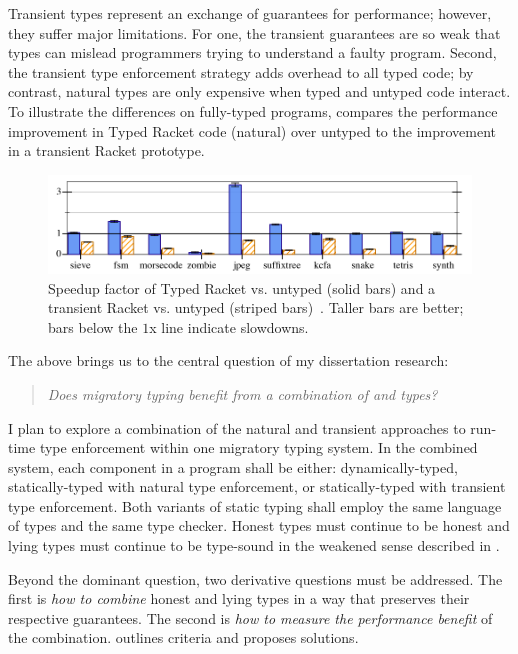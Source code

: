 Transient types represent an exchange of guarantees for performance;
 however, they suffer major limitations.
For one, the transient guarantees are so weak that types can mislead
 programmers trying to understand a faulty program.
Second, the transient type enforcement strategy adds overhead to all typed code;
 by contrast, natural types are only expensive when typed and untyped code interact.
To illustrate the differences on fully-typed programs,
  compares the performance improvement
 in Typed Racket code (natural) over untyped to the improvement in a
 transient Racket prototype.

\begin{figure}[h]
  \includegraphics[width=0.8\columnwidth]{src/icfp-bars.png}
  \caption{Speedup factor of Typed Racket vs. untyped (solid bars) and a transient Racket vs. untyped (striped bars)~\cite{gf-icfp-2018}.
           Taller bars are better; bars below the $1$x line indicate slowdowns.}
  \label{fig:icfp-bars}
\end{figure}

\noindent
The above brings us to the central question of my dissertation research:

\begin{quote}
  \emph{Does migratory typing benefit from a combination of \tdeep{} and \tshallow{} types?}
\end{quote}

I plan to explore a combination of the natural and transient approaches to
 run-time type enforcement within one migratory typing system.
In the combined system, each component in a program shall be either:
 dynamically-typed,
 statically-typed with natural type enforcement,
 or statically-typed with transient type enforcement.
Both variants of static typing shall employ the same language of types and the
 same type checker.
Honest types must continue to be honest
 and lying types must continue to be type-sound
 in the weakened sense described in .

Beyond the dominant question, two derivative questions must be addressed.
The first is \emph{how to combine}\/ honest and lying
 types in a way that preserves their respective guarantees.
The second is \emph{how to measure the performance benefit}\/ of the combination.
 outlines criteria and proposes solutions.

